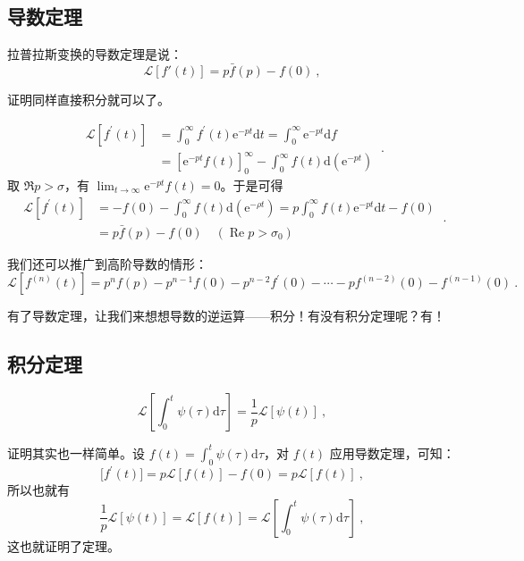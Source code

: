\subsection{导数定理}

拉普拉斯变换的导数定理是说：
\begin{equation}
\mathscr L[f'(t)]=p\bar f(p)-f(0)~,
\end{equation}

证明同样直接积分就可以了。

\begin{equation}
\begin{aligned} \mathscr L[f^{\prime}(t)] & = \int_{0}^{\infty} f^{\prime}(t) \mathrm{e}^{-p t} \mathrm{d} t=\int_{0}^{\infty} \mathrm{e}^{-p t} \mathrm{d} f \\ &=\left[\mathrm{e}^{-p t} f(t)\right]_{0}^{\infty}-\int_{0}^{\infty} f(t) \mathrm{d}\left(\mathrm{e}^{-p t}\right) \end{aligned}~.
\end{equation}
取 $\Re p>\sigma$，有 $\lim_{t\to\infty}\mathrm{e}^{-pt}f(t)=0$。于是可得
\begin{equation}
\begin{aligned} \mathscr L[f^{\prime}(t)] & = -f(0)-\int_{0}^{\infty} f(t) \mathrm{d}\left(\mathrm{e}^{-\rho t}\right)=p \int_{0}^{\infty} f(t) \mathrm{e}^{-p t} \mathrm{d} t-f(0) \\ &=p \bar{f}(p)-f(0) \quad\left(\operatorname{Re} p>\sigma_{0}\right) \end{aligned}~.
\end{equation}

我们还可以推广到高阶导数的情形：
\begin{equation}
\mathscr L[f^{(n)}(t)] = p^{n} f(p)-p^{n-1} f(0)-p^{n-2} f^{\prime}(0)-\cdots-p f^{(n-2)}(0)-f^{(n-1)}(0)~.
\end{equation} 

有了导数定理，让我们来想想导数的逆运算——积分！有没有积分定理呢？有！

\subsection{积分定理}
\begin{equation}
\mathscr L\left[\int_{0}^{t} \psi(\tau) \mathrm{d} \tau \right]=\frac{1}{p} \mathscr{L}[\psi(t)]~,
\end{equation}

证明其实也一样简单。设 $\displaystyle f(t)=\int_{0}^{t} \psi(\tau) \mathrm{d} \tau$，对 $f(t)$ 应用导数定理，可知：
\begin{equation}
\mathscr[f^{\prime}(t)]=p \mathscr{L}[f(t)]-f(0)=p \mathscr{L}[f(t)]~,
\end{equation}
所以也就有
\begin{equation}
\frac{1}{p} \mathscr{L}[\psi(t)]=\mathscr{L}[f(t)]=\mathscr{L}\left[\int_{0}^{t} \psi(\tau) \mathrm{d} \tau\right]~,
\end{equation}
这也就证明了定理。
 
